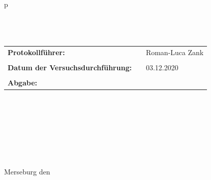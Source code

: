 \begin{center}
\begin{tabular}{p{\textwidth}}
\\ \\ \\ \\

\begin{center}
\begin{tabular}{lll}
\large{\textbf{Protokollführer:}} & & \large{Roman-Luca Zank}\\
&&\\
\large{\textbf{Datum der Versuchsdurchführung:}}&& \large{03.12.2020}\\
&&\\
\large{\textbf{Abgabe:}}&& \large{\todayDE}
\end{tabular}
\end{center}

\\ \\ \\ \\ \\ \\ \\
\large{Merseburg den \todayDE}

\end{tabular}
\end{center}
